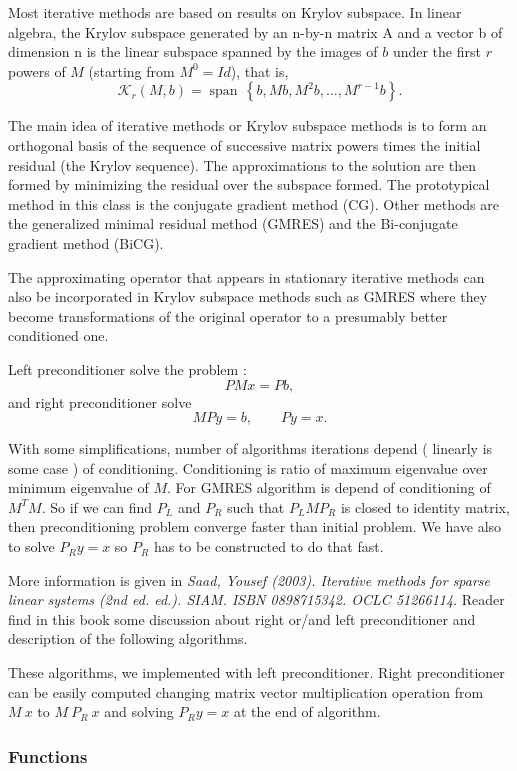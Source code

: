 Most iterative methods are based on results on Krylov subspace. In linear
algebra, the Krylov subspace generated by an n-by-n matrix A and a vector b of
dimension n is the linear subspace spanned by the images of $b$ under the
first $r$ powers of $M$ (starting from $M^0 = Id$), that is,
$$  \mathcal{K}_r(M, b) = \operatorname{span} \, \left\{ b, M b, M^2b,
  \ldots, M^{r-1}b\right\}.$$ 

The main idea of iterative methods or Krylov subspace methods is to form an
orthogonal basis of the sequence of successive matrix powers times the initial
residual (the Krylov sequence). The approximations to the solution are then
formed by minimizing the residual over the subspace formed.  The prototypical
method in this class is the conjugate gradient method (CG). Other methods are
the generalized minimal residual method (GMRES) and the Bi-conjugate gradient
method (BiCG).

The approximating operator that appears in stationary iterative methods can
also be incorporated in Krylov subspace methods such as GMRES where they
become transformations of the original operator
to a presumably better conditioned one.

Left preconditioner solve the problem :
$$ P M x = P b, $$
and right preconditioner solve
$$ M P y  = b, \quad \quad P y = x.$$

With some simplifications, number of algorithms iterations depend ( linearly is
some case ) of conditioning. Conditioning is ratio of maximum eigenvalue over
minimum eigenvalue of $M$. For GMRES algorithm is depend of conditioning of
$M^{T} M$. So if we can find $P_L$ and $P_R$ such that $P_L M P_R$ is closed to
identity matrix, then preconditioning problem converge faster than initial
problem. We have also to solve $P_R y = x$ so $P_R$ has to be constructed to do
that fast.

More information is given in {\em Saad, Yousef (2003). Iterative methods for
  sparse linear systems (2nd ed. ed.). SIAM. ISBN 0898715342. OCLC 51266114}.
Reader find in this book some discussion about right or/and left preconditioner
and description of the following algorithms. 

These algorithms, we implemented with left preconditioner. Right preconditioner
can be easily computed changing matrix vector multiplication operation from $M \
x $ to $ M \ P_R \ x$ and solving $P_R y = x$ at the end of algorithm.


\subsubsection{Functions}

